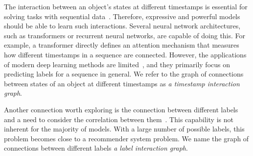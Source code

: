 \documentclass[runningheads]{llncs}
\begin{document}

The interaction between an object's states at different timestamps is essential for solving tasks with sequential data~\cite{hartvigsen2020recurrent}. Therefore, expressive and powerful models should be able to learn such interactions. Several neural network architectures, such as transformers or recurrent neural networks, are capable of doing this. For example, a transformer directly defines an attention mechanism that measures how different timestamps in a sequence are connected. However, the applications of modern deep learning methods are limited~\cite{zhang2020multi}, and they primarily focus on predicting labels for a sequence in general. 
We refer to the graph of connections between states of an object at different timestamps as \textit{a timestamp interaction graph}.

Another connection worth exploring is the connection between different labels and a need to consider the correlation between them~\cite{hang2021collaborative}. This capability is not inherent for the majority of models. With a large number of possible labels, this problem becomes close to a recommender system problem.
We name the graph of connections between different labels \textit{a label interaction graph}.
\end{document}
